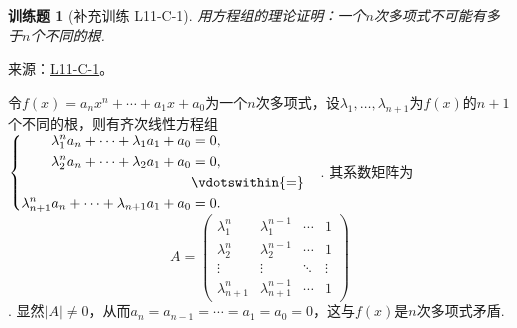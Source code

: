 \documentclass[UTF8,12pt,a4paper,fontset=fandol]{ctexart}
\newtheorem{exercise}{训练题}[section]
\begin{document}
\begin{exercise}[补充训练 L11-C-1]\label{prob:L11-C-1}
用方程组的理论证明：一个$n$次多项式不可能有多于$n$个不同的根.
\end{exercise}
\noindent 来源：\href{https://github.com/yhwu-is/Linear-Algebra-Left-Undone/blob/new/%E8%AE%B2%E4%B9%89/%E4%B8%93%E9%A2%98/11%20%E6%9C%9D%E8%8A%B1%E5%A4%95%E6%8B%BE.tex}{L11-C-1}。
\begin{solve}
令$f(x)=a_nx^n+\cdots+a_1x+a_0$为一个$n$次多项式，设$\lambda_1,\ldots,\lambda_{n+1}$为$f(x)$的$n+1$个不同的根，则有齐次线性方程组$\begin{cases} \begin{aligned}
                \lambda_1^n a_n+\cdots+\lambda_1a_1+a_0         & =0,               \\
                \lambda_2^n a_n+\cdots+\lambda_2a_1+a_0         & =0,               \\
                                                                & \vdotswithin{ = } \\
                \lambda_{n+1}^n a_n+\cdots+\lambda_{n+1}a_1+a_0 & =0.
            \end{aligned} \end{cases}$. 其系数矩阵为
\[A=\begin{pmatrix}
            \lambda_1^n     & \lambda_1^{n-1}     & \cdots & 1      \\
            \lambda_2^n     & \lambda_2^{n-1}     & \cdots & 1      \\
            \vdots          & \vdots              & \ddots & \vdots \\
            \lambda_{n+1}^n & \lambda_{n+1}^{n-1} & \cdots & 1
        \end{pmatrix}\]
. 显然$|A|\neq 0$，从而$a_n=a_{n-1}=\cdots=a_1=a_0=0$，这与$f(x)$是$n$次多项式矛盾.
\end{solve}
\end{document}
